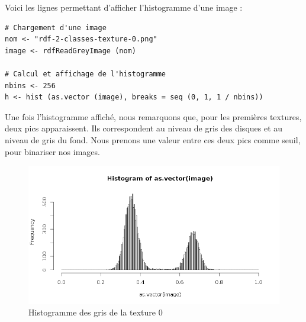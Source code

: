 \documentclass[11pt]{article}
\begin{document}
  \newpage
  
  Voici les lignes permettant d'afficher l'histogramme d'une image :
  
  \begin{lstlisting}[caption=Afficher l'histogramme d'une image]
# Chargement d'une image
nom <- "rdf-2-classes-texture-0.png"
image <- rdfReadGreyImage (nom)

# Calcul et affichage de l'histogramme
nbins <- 256
h <- hist (as.vector (image), breaks = seq (0, 1, 1 / nbins))\end{lstlisting}

  Une fois l'histogramme affiché, nous remarquons que, pour les premières textures, deux pics apparaissent. 
  Ils correspondent au niveau de gris des disques et au niveau de gris du fond. Nous prenons une valeur 
  entre ces deux pics comme seuil, pour binariser nos images.
  
  \begin{figure}[H]
    \center
    \includegraphics[width=14cm]{../elliot/gris0.png}
    \caption{Histogramme des gris de la texture 0}
  \end{figure}
\end{document}
